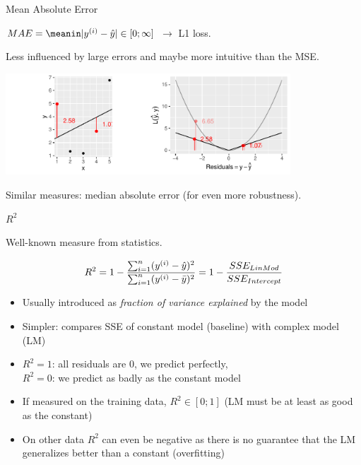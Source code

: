 \documentclass[11pt,compress,t,notes=noshow, xcolor=table]{beamer}
\newenvironment{knitrout}{}{} %
\begin{document}
\begin{vbframe}{Mean Absolute Error}

\begin{center}
$
MAE = \meanin |\yi - \yih| \in [0;\infty]
$
\hspace{4em} $\rightarrow$ L1 loss.
\end{center}

\lz
Less influenced by large errors and maybe more intuitive than the MSE.

\begin{knitrout}\scriptsize
{}\color{fgcolor}

{\centering \includegraphics[width=0.8\textwidth]{figure/plot_abs_loss} 

}



\end{knitrout}

Similar measures: median absolute error (for even more robustness).

\end{vbframe}

\begin{vbframe}{$R^2$}

Well-known measure from statistics.

\[
R^2 = 1 - \frac{\sum_{i=1}^n (y^{(i)} - \hat{y})^2}{\sum_{i=1}^n (y^{(i)} - \bar{y})^2} = 1 - \frac{SSE_{LinMod}}{SSE_{Intercept}}
\]

\begin{itemize}
\item Usually introduced as \textit{fraction of variance explained} by the model
\item Simpler: compares SSE of constant model (baseline) with complex model (LM)
\item $R^2=1$: all residuals are 0, we predict perfectly, \\
$R^2=0$: we predict as badly as the constant model
\item If measured on the training data, $R^2 \in [0;1]$ (LM must be at least as good as the constant)
\item On other data $R^2$ can even be negative as there is no guarantee that the LM generalizes better than a constant (overfitting)
\end{itemize}
\end{vbframe}
\end{document}
